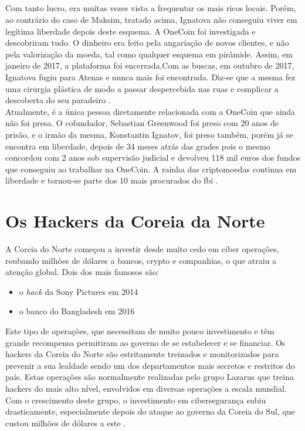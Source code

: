 \documentclass{report}
\begin{document}
\\
\\
\\   %
\\
Com tanto lucro, era muitas vezes vista a frequentar os mais ricos locais. Porém, ao contrário do caso de Maksim, tratado acima, Ignatova não conseguiu viver em legítima liberdade depois deste esquema. A OneCoin foi investigada e descobriram tudo. O dinheiro era feito pela angariação de novos clientes, e não pela valorização da moeda, tal como qualquer esquema em pirâmide. Assim, em janeiro de 2017, a plataforma foi encerrada.Com as buscas, em outubro de 2017, Ignatova fugiu para Atenas e nunca mais foi encontrada. Diz-se que a mesma fez uma cirurgia plástica de modo a passar despercebida nas ruas e complicar a descoberta do seu paradeiro \cite{osmaisprocurados}.  
\\ \indent Atualmente, é a única pessoa diretamente relacionada com a OneCoin que ainda não foi presa. O cofundador, Sebastian Greenwood foi preso com 20 anos de prisão, e o irmão da mesma, Konstantin Ignatov, foi preso também, porém já se encontra em liberdade, depois de 34 meses atrás das grades pois o mesmo concordou com 2 anos sob supervisão judicial e devolveu 118 mil euros dos fundos que conseguiu ao trabalhar na OneCoin. A rainha das criptomoedas continua em liberdade e tornou-se parte dos 10 mais procurados do \ac{fbi} \cite{fbi}. 

\section{Os Hackers da Coreia da Norte}
A Coreia do Norte começou a investir desde muito cedo em ciber operações, roubando milhões de dólares a bancos, crypto e companhias, o que atraiu a atenção global. Dois dos mais famosos são:

\begin{itemize}

\item{o \textit{hack} da Sony Pictures em 2014}
\item{o banco do Bangladesh em 2016}

\end{itemize}

Este tipo de operações, que necessitam de muito pouco investimento e têm grande recompensa permitiram ao governo de se estabelecer e se financiar. Os hackers da Coreia do Norte são estritamente treinados e monitorizados para prevenir a sua lealdade sendo um dos departamentos mais secretos e restritos do país. Estas operações são normalmente realizadas pelo grupo Lazarus que treina hackers do mais alto nível, envolvidos em diversas operações a escala mundial. Com o crescimento deste grupo, o investimento em cibersegurança subiu drasticamente, especialmente depois do ataque ao governo da Coreia do Sul, que custou milhões de dólares a este \cite{coreia}. 
\end{document}
